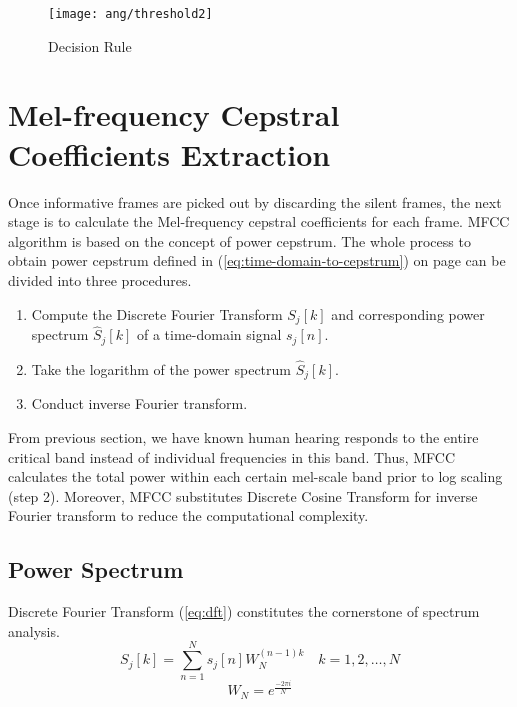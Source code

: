 \begin{figure}[H]
\centering
\texttt{[image: ang/threshold2]}
\caption{Decision Rule}
\label{threshold2}
\end{figure}


\section{Mel-frequency Cepstral Coefficients Extraction}
\label{subsection:mfcc}

Once informative frames are picked out by discarding the silent frames, the next stage is to calculate the Mel-frequency cepstral coefficients for each frame. MFCC algorithm is based on the concept of power cepstrum. The whole process to obtain power cepstrum defined in (\ref{eq:time-domain-to-cepstrum}) on page \pageref{eq:time-domain-to-cepstrum} can be divided into three procedures.
\begin{enumerate}
	\item Compute the Discrete Fourier Transform $S_j[k]$ and corresponding power spectrum $\hat{S}_j[k]$ of a time-domain signal $s_j[n]$.
	\item Take the logarithm of the power spectrum $\hat{S}_j[k]$.
	\item Conduct inverse Fourier transform.
\end{enumerate}

From previous section, we have known human hearing responds to the entire critical band instead of individual frequencies in this band. Thus, MFCC calculates the total power within each certain mel-scale band prior to log scaling (step 2). Moreover, MFCC substitutes Discrete Cosine Transform for inverse Fourier transform to reduce the computational complexity.

\subsection{Power Spectrum}

Discrete Fourier Transform (\ref{eq:dft}) constitutes the cornerstone of spectrum analysis.
\begin{equation}
\label{eq:dft}
S_j[k] = \sum_{n=1}^{N} s_j[n] W_N^{(n-1) k} \quad k = 1, 2, \dots, N
\end{equation}
\begin{equation}
W_N = e^{\frac{- 2\pi i}{N}}
\end{equation}

